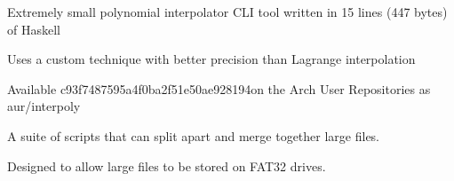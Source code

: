 \documentclass[letterpaper]{deedy-resume} %
\begin{document}
\begin{minipage}[t]{0.66\textwidth}

\vspace{1mm} %

\begin{tightitemize}
    \item Extremely small polynomial interpolator CLI tool written in 15 lines (447 
        bytes) of Haskell
    \item Uses a custom technique with better precision than Lagrange 
        interpolation
    \item Available c93f7487595a4f0ba2f51e50ae928194on the Arch User Repositories as aur/interpoly
\end{tightitemize}
\sectionspace


\vspace{1mm} %

\begin{tightitemize}
    \item A suite of scripts that can split apart and merge together large files. 
    \item Designed to allow large files to be stored on FAT32 drives.
\end{tightitemize}
\sectionspace








\end{minipage}
\end{document}
